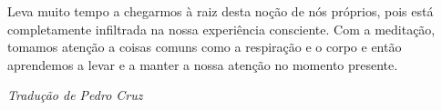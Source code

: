 Leva muito tempo a chegarmos à raiz desta noção de nós próprios, pois
está completamente infiltrada na nossa experiência consciente. Com a
meditação, tomamos atenção a coisas comuns como a respiração e o corpo e
então aprendemos a levar e a manter a nossa atenção no momento presente.


\vfill
{\raggedleft\itshape\small
  Tradução de Pedro Cruz
\par}
